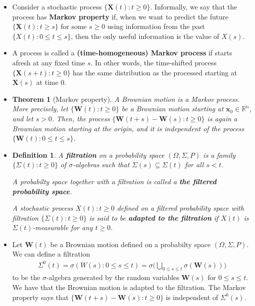 \documentclass[10pt]{article}
\newtheorem{theorem}[lemma]{Theorem}
\newtheorem{definition}[lemma]{Definition}
\newcommand{\ve}[1]{\mathbf{#1}}
\newcommand{\Real}{\mathbb{R}}
\begin{document}
\begin{itemize}
  \item Consider a stochastic process $\{ \ve{X}(t) : t \geq 0 \}$. Informally, we say that the process has {\bf Markov property} if, when we want to predict the future $\{ \ve{X}(t) : t \geq s \}$ for some $s \geq 0$ using information from the past $\{ X(t) : 0 \leq t \leq s \}$, then the only useful information is the value of $X(s)$.
  
  \item A process is called a {\bf (time-homogeneous) Markov process} if starts afresh at any fixed time $s$. In other words, the time-shifted process $\{ \ve{X}(s+t) : t \geq 0 \}$ has the same distribution as the processed starting at $\ve{X}(s)$ at time $0$.
  
  \item \begin{theorem}[Markov property]
    A Brownian motion is a Markov process. More precisely, let $\{\ve{W}(t) : t \geq 0\}$ be a Brownian motion starting at $\ve{x}_0 \in \Real^n$, and let $s > 0$. Then, the process $\{ \ve{W}(t+s) - \ve{W}(s) : t \geq 0\}$ is again a Brownian motion starting at the origin, and it is independent of the process $\{ \ve{W}(t) : 0 \leq t \leq s \} $.
  \end{theorem}

  \item \begin{definition}
    A {\bf filtration} on a probability space $(\Omega, \Sigma, P)$ is a family $\{ \Sigma(t): t \geq 0 \}$ of $\sigma$-algebras such that $\Sigma(s) \subseteq \Sigma(t)$ for all $s < t$. 
    
    
    A probabilty space together with a filtration is called a {\bf the filtered probability space}. 
    
    A stochastic process ${X(t): t \geq 0}$ defined on a filtered probability space with filtration $\{ \Sigma(t): t \geq 0 \}$ is said to be {\bf adapted to the filtration} if $X(t)$ is $\Sigma(t)$-measurable for any $t \geq 0$. 
  \end{definition}

  \item Let $\ve{W}(t)$ be a Brownian motion defined on a probabilty space $(\Omega,\Sigma,P)$. We can define a filtration
  \begin{align*}
    \Sigma^0(t) = \sigma(W(s) : 0 \leq s \leq t) = \sigma\bigg( \bigcup_{0\leq s \leq t} \sigma(\ve{W}(s)) \bigg)
  \end{align*}
  to be the $\sigma$-algebra generated by the random variables $\ve{W}(s)$ for $0 \leq s \leq t$. We have that the Brownian motion is adapted to the filtration. The Markov property says that $\{ \ve{W}(t+s) - \ve{W}(s) : t \geq 0 \}$ is independent of $\Sigma^0(s)$.


\end{itemize}
\end{document}
